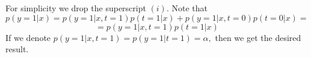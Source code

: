 \begin{answer}
For simplicity we drop the superscript $(i).$
Note that
$$p(y = 1| x) = p(y = 1|x, t = 1)p(t = 1|x) + p(y = 1|x, t = 0)p(t = 0|x) = $$
$$ = p(y = 1|x, t = 1)p(t = 1|x)$$
If we denote $ p(y = 1|x, t = 1) = p(y = 1| t = 1) = \alpha,$
then we get the desired result.
\end{answer}

